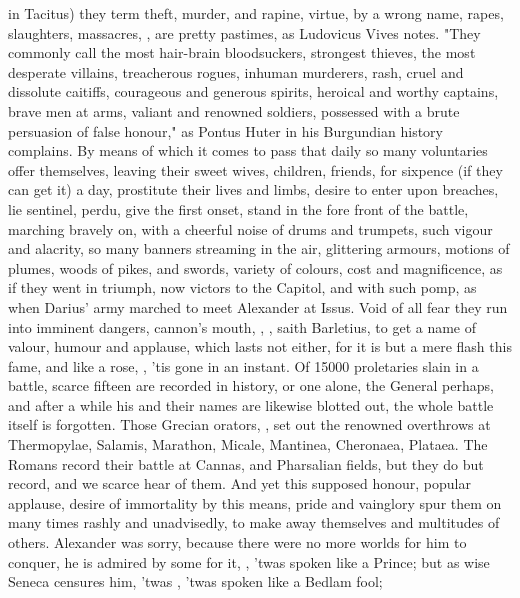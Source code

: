in Tacitus) they term theft, murder, and rapine, virtue, by a wrong name,
rapes, slaughters, massacres, \etc{} , are pretty pastimes,
as Ludovicus Vives notes. "They commonly call the most
hair-brain bloodsuckers, strongest thieves, the most desperate villains,
treacherous rogues, inhuman murderers, rash, cruel and dissolute caitiffs,
courageous and generous spirits, heroical and worthy captains,
brave men at arms, valiant and renowned soldiers, possessed
with a brute persuasion of false honour," as Pontus Huter in his Burgundian
history complains. By means of which it comes to pass that daily so many
voluntaries offer themselves, leaving their sweet wives, children, friends, for
sixpence (if they can get it) a day, prostitute their lives and limbs, desire
to enter upon breaches, lie sentinel, perdu, give the first onset, stand in the
fore front of the battle, marching bravely on, with a cheerful noise of drums
and trumpets, such vigour and alacrity, so many banners streaming in the air,
glittering armours, motions of plumes, woods of pikes, and swords, variety of
colours, cost and magnificence, as if they went in triumph, now victors to the
Capitol, and with such pomp, as when Darius' army marched to meet Alexander at
Issus. Void of all fear they run into imminent dangers, cannon's mouth, \etc{},
, saith
Barletius, to get a name of valour, humour and applause,
which lasts not either, for it is but a mere flash this fame, and like a rose,
, 'tis gone in an instant. Of 15\thinspace{}000
proletaries slain in a battle, scarce fifteen are recorded in history, or one
alone, the General perhaps, and after a while his and their names are likewise
blotted out, the whole battle itself is forgotten. Those Grecian orators,
, set out the renowned overthrows at
Thermopylae, Salamis, Marathon, Micale, Mantinea, Cheronaea, Plataea. The
Romans record their battle at Cannas, and Pharsalian fields, but they do but
record, and we scarce hear of them. And yet this supposed honour, popular
applause, desire of immortality by this means, pride and vainglory spur them on
many times rashly and unadvisedly, to make away themselves and multitudes of
others. Alexander was sorry, because there were no more worlds for him to
conquer, he is admired by some for it, ,
'twas spoken like a Prince; but as wise Seneca censures
him, 'twas , 'twas spoken like a Bedlam fool;
